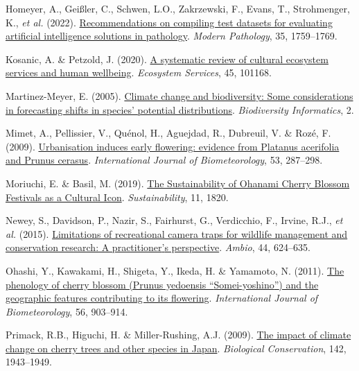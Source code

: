 \documentclass[
  letterpaper,
]{scrbook}
\newlength{\cslhangindent}
\newenvironment{CSLReferences}[2] %
 {\begin{list}{}{%
  \setlength{\itemindent}{0pt}
  \setlength{\leftmargin}{0pt}
  \setlength{\parsep}{0pt}
  \ifodd #1
   \setlength{\leftmargin}{\cslhangindent}
   \setlength{\itemindent}{-1\cslhangindent}
  \fi
  \setlength{\itemsep}{#2\baselineskip}}}
 {\end{list}}
\begin{document}
\begin{CSLReferences}{1}{0}
Homeyer, A., Geißler, C., Schwen, L.O., Zakrzewski, F., Evans, T.,
Strohmenger, K., \emph{et al.} (2022).
\href{https://doi.org/10.1038/s41379-022-01147-y}{Recommendations on
compiling test datasets for evaluating artificial intelligence solutions
in pathology}. \emph{Modern Pathology}, 35, 1759--1769.

Kosanic, A. \& Petzold, J. (2020).
\href{https://doi.org/10.1016/j.ecoser.2020.101168}{A systematic review
of cultural ecosystem services and human wellbeing}. \emph{Ecosystem
Services}, 45, 101168.

Martinez-Meyer, E. (2005).
\href{https://doi.org/10.17161/bi.v2i0.8}{Climate change and
biodiversity: Some considerations in forecasting shifts in species'
potential distributions}. \emph{Biodiversity Informatics}, 2.

Mimet, A., Pellissier, V., Quénol, H., Aguejdad, R., Dubreuil, V. \&
Rozé, F. (2009).
\href{https://doi.org/10.1007/s00484-009-0214-7}{Urbanisation induces
early flowering: evidence from Platanus acerifolia and Prunus cerasus}.
\emph{International Journal of Biometeorology}, 53, 287--298.

Moriuchi, E. \& Basil, M. (2019).
\href{https://doi.org/10.3390/su11061820}{The Sustainability of Ohanami
Cherry Blossom Festivals as a Cultural Icon}. \emph{Sustainability}, 11,
1820.

Newey, S., Davidson, P., Nazir, S., Fairhurst, G., Verdicchio, F.,
Irvine, R.J., \emph{et al.} (2015).
\href{https://doi.org/10.1007/s13280-015-0713-1}{Limitations of
recreational camera traps for wildlife management and conservation
research: A practitioner{'}s perspective}. \emph{Ambio}, 44, 624--635.

Ohashi, Y., Kawakami, H., Shigeta, Y., Ikeda, H. \& Yamamoto, N. (2011).
\href{https://doi.org/10.1007/s00484-011-0496-4}{The phenology of cherry
blossom (Prunus yedoensis {``}Somei-yoshino{''}) and the geographic
features contributing to its flowering}. \emph{International Journal of
Biometeorology}, 56, 903--914.

Primack, R.B., Higuchi, H. \& Miller-Rushing, A.J. (2009).
\href{https://doi.org/10.1016/j.biocon.2009.03.016}{The impact of
climate change on cherry trees and other species in Japan}.
\emph{Biological Conservation}, 142, 1943--1949.


\end{CSLReferences}
\end{document}

